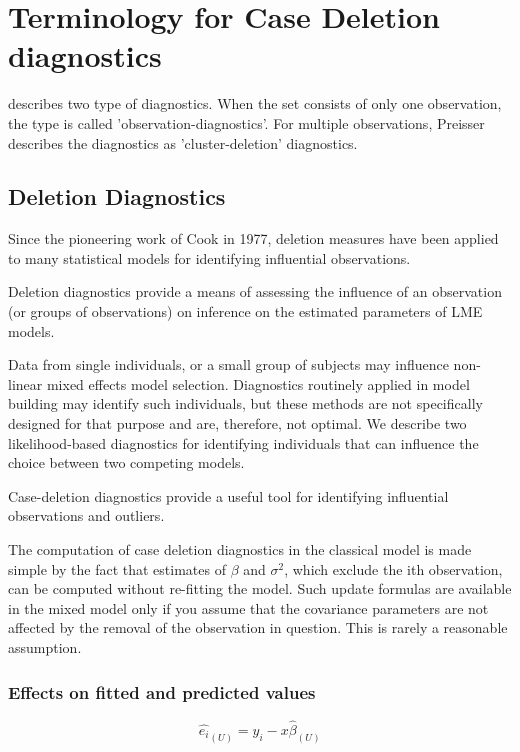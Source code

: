 \documentclass[Main.tex]{subfiles}
\begin{document}
	
	
	
	
	
	\newpage
	\section{Terminology for Case Deletion diagnostics} %
	
	\citet{preisser} describes two type of diagnostics. When the set consists of only one observation, the type is called
	'observation-diagnostics'. For multiple observations, Preisser describes the diagnostics as 'cluster-deletion' diagnostics.
	
	
	\subsection{Deletion Diagnostics}
	
	Since the pioneering work of Cook in 1977, deletion measures have been applied to many statistical models for identifying influential observations.
	
	Deletion diagnostics provide a means of assessing the influence of an observation (or groups of observations) on inference on the estimated parameters of LME models.
	
	Data from single individuals, or a small group of subjects may influence non-linear mixed effects model selection. Diagnostics routinely applied in model building may identify such individuals, but these methods are not specifically designed for that purpose and are, therefore, not optimal. We describe two likelihood-based diagnostics for identifying individuals that can influence the choice between two competing models.
	
	Case-deletion diagnostics provide a useful tool for identifying influential observations and outliers.
	
	The computation of case deletion diagnostics in the classical model is made simple by the fact that estimates of $\beta$ and $\sigma^2$, which exclude the ith observation, can be computed without re-fitting the model. Such update formulas are available in the mixed model only if you assume that the covariance parameters are not affected by the removal of the observation in question. This is rarely a reasonable assumption.
	
	\subsubsection{Effects on fitted and predicted values}
	\begin{equation}
	\hat{e_{i}}_{(U)} = y_{i} - x\hat{\beta}_{(U)}
	\end{equation}
	\newpage
	
\end{document}
